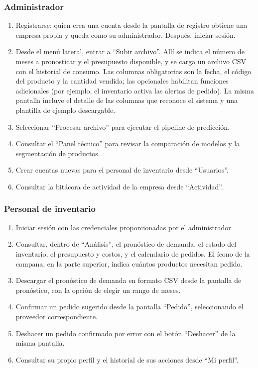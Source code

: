 \subsubsection*{Administrador}
\begin{enumerate}
    \item Registrarse: quien crea una cuenta desde la pantalla de registro obtiene una empresa propia y queda como su administrador. Después, iniciar sesión.
    \item Desde el menú lateral, entrar a ``Subir archivo''. Allí se indica el número de meses a pronosticar y el presupuesto disponible, y se carga un archivo CSV con el historial de consumo. Las columnas obligatorias son la fecha, el código del producto y la cantidad vendida; las opcionales habilitan funciones adicionales (por ejemplo, el inventario activa las alertas de pedido). La misma pantalla incluye el detalle de las columnas que reconoce el sistema y una plantilla de ejemplo descargable.
    \item Seleccionar ``Procesar archivo'' para ejecutar el pipeline de predicción.
    \item Consultar el ``Panel técnico'' para revisar la comparación de modelos y la segmentación de productos.
    \item Crear cuentas nuevas para el personal de inventario desde ``Usuarios''.
    \item Consultar la bitácora de actividad de la empresa desde ``Actividad''.
\end{enumerate}

\subsubsection*{Personal de inventario}
\begin{enumerate}
    \item Iniciar sesión con las credenciales proporcionadas por el administrador.
    \item Consultar, dentro de ``Análisis'', el pronóstico de demanda, el estado del inventario, el presupuesto y costos, y el calendario de pedidos. El ícono de la campana, en la parte superior, indica cuántos productos necesitan pedido.
    \item Descargar el pronóstico de demanda en formato CSV desde la pantalla de pronóstico, con la opción de elegir un rango de meses.
    \item Confirmar un pedido sugerido desde la pantalla ``Pedido'', seleccionando el proveedor correspondiente.
    \item Deshacer un pedido confirmado por error con el botón ``Deshacer'' de la misma pantalla.
    \item Consultar su propio perfil y el historial de sus acciones desde ``Mi perfil''.
\end{enumerate}


